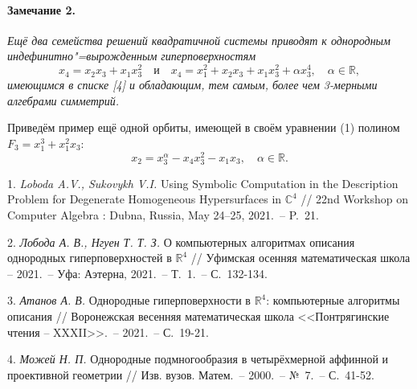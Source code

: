 \paragraph{Замечание 2.} {\it
	Ещё два семейства решений квадратичной системы приводят к однородным индефинитно"=вырожденным гиперповерхностям
	\begin{equation*}
		x_4 = x_2 x_3 + x_1 x_3^2 \quad \text{и} \quad x_4 = x_1^2 + x_2 x_3 + x_1 x_3^2 + \alpha x_3^4,  \quad \alpha \in \mathbb{R},
	\end{equation*}
	имеющимся в списке [4] и обладающим, тем самым, более чем 3-мерными алгебрами симметрий.
}

Приведём пример ещё одной орбиты, имеющей в своём уравнении (1) полином $F_3 = x_1^3 + x_1^2x_3$: \begin{equation*}
	x_2 = x_3^{\alpha} - x_4x_3^2 - x_1x_3, \quad \alpha \in \mathbb{R}.
\end{equation*}

\litlist

1. {\it Loboda A.V., Sukovykh V.I.} Using Symbolic Computation in the Description
Problem for Degenerate Homogeneous Hy\-per\-sur\-fa\-ces in $\mathbb{C}^4$ // 22nd Workshop on Computer Algebra : Dubna, Russia, May 24–25, 2021.~-- P.~21.

2. {\it Лобода А. В., Нгуен Т. Т. З.} О компьютерных алгоритмах описания однородных гиперповерхностей в $\mathbb{R}^4$ // Уфимская осенняя математическая школа -- 2021.~-- Уфа: Аэтерна, 2021.~-- Т.~1.~-- С.~132-134.

3. {\it Атанов А. В.} Однородные гиперповерхности в $\mathbb{R}^4$: компьютерные алгоритмы описания // Воронежская весенняя математическая школа <<Понтрягинские чтения -- XXXII>>.~-- 2021.~-- С.~19-21.

4. {\it Можей Н. П.} Однородные подмногообразия в четырёхмерной аффинной и проективной геометрии // Изв. вузов. Матем.~-- 2000.~-- №~7.~-- С.~41-52.

